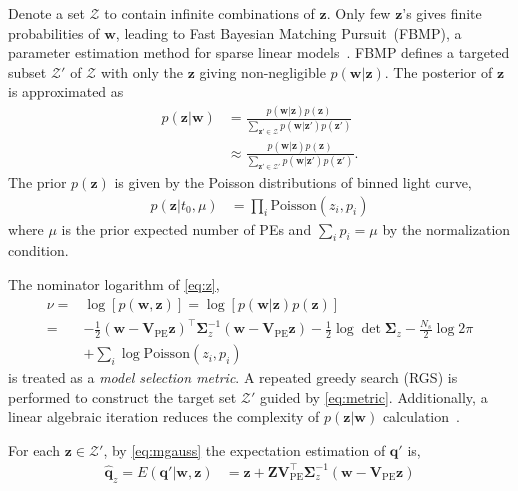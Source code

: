 Denote a set $\mathcal{Z}$ to contain infinite combinations of $\bm{z}$. Only few $\bm{z}$'s gives finite probabilities of $\bm{w}$, leading to Fast Bayesian Matching Pursuit~(FBMP), a parameter estimation method for sparse linear models~\cite{schniter_fast_nodate}.  FBMP defines a targeted subset $\mathcal{Z}'$ of $\mathcal{Z}$ with only the $\bm{z}$ giving non-negligible $p(\bm{w}|\bm{z})$.  The posterior of $\bm{z}$ is approximated as
\begin{equation}
    \label{eq:z}
    \begin{aligned}
    p(\bm{z}|\bm{w}) &= \frac{p(\bm{w}|\bm{z})p(\bm{z})}{\sum_{\bm{z}'\in\mathcal{Z}}p(\bm{w}|\bm{z'})p(\bm{z'})} \\
    &\approx \frac{p(\bm{w}|\bm{z})p(\bm{z})}{\sum_{\bm{z}'\in\mathcal{Z}'}p(\bm{w}|\bm{z'})p(\bm{z'})}.
    \end{aligned}
\end{equation}
The prior $p(\bm{z})$ is given by the Poisson distributions of binned light curve,
\begin{equation}
\begin{aligned}
    p(\bm{z}|t_0, \mu) &= \prod_{i}\mathrm{Poisson}(z_i,p_i)
\end{aligned}
\end{equation}
where $\mu$ is the prior expected number of PEs and $\sum_i p_i = \mu$ by the normalization condition. 

The nominator logarithm of \eqref{eq:z},
\begin{equation}
    \label{eq:metric}
    \begin{aligned}
        \nu =& \log[p(\bm{w},\bm{z})] = \log[p(\bm{w}|\bm{z})p(\bm{z})] \\
        =& -\frac{1}{2}(\bm{w}-\bm{V}_\mathrm{PE}\bm{z})^\intercal\bm{\Sigma}_z^{-1}(\bm{w}-\bm{V}_\mathrm{PE}\bm{z})-\frac{1}{2}\log\det\bm{\Sigma}_z-\frac{N_s}{2}\log2\pi \\
        & +\sum_{i}\log{\mathrm{Poisson}(z_i,p_i)}
    \end{aligned}
\end{equation}
is treated as a \textit{model selection metric}.  A repeated greedy search (RGS) is performed to construct the target set $\mathcal{Z}'$ guided by \eqref{eq:metric}. Additionally, a linear algebraic iteration reduces the complexity of $p(\bm{z}|\bm{w})$ calculation~\cite{schniter_fast_nodate}. 

For each $\bm{z} \in \mathcal{Z}'$, by \eqref{eq:mgauss} the expectation estimation of $\bm{q}'$ is, 
\begin{align}
    \hat{\bm{q}}_z = E(\bm{q}'|\bm{w},\bm{z}) &= \bm{z} + \bm{Z}\bm{V}_\mathrm{PE}^\intercal\bm{\Sigma}_z^{-1}(\bm{w}-\bm{V}_\mathrm{PE}\bm{z})
    \label{eq:fbmpcharge}
\end{align}

